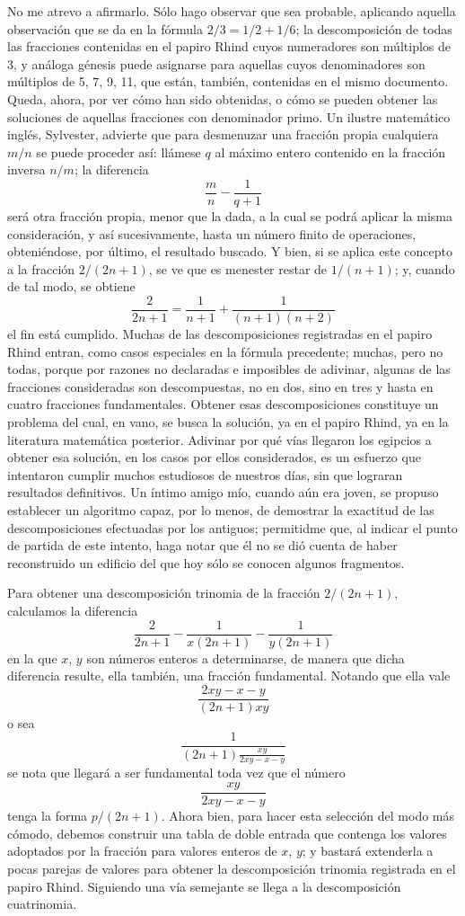 \documentclass[a4paper, 12pt, draft]{article}
\begin{document}
No me atrevo a afirmarlo. Sólo hago observar que sea probable, aplicando aquella observación que se da en la fórmula $2/3 = 1/2 + 1/6$; la descomposición de todas las fracciones contenidas en el papiro Rhind cuyos numeradores son múltiplos de 3, y análoga génesis puede asignarse para aquellas cuyos denominadores son múltiplos de 5, $7$, 9, 11, que están, también, contenidas en el mismo documento. Queda, ahora, por ver cómo han sido obtenidas, o cómo se pueden obtener las soluciones de aquellas fracciones con denominador primo. Un ilustre matemático inglés, Sylvester, advierte que para desmenuzar una fracción propia cualquiera $m/n$ se puede proceder así: llámese $q$ al máximo entero contenido en la fracción inversa $n/m$; la diferencia
$$
\frac{m}{n}-\frac{1}{q+1}
$$
será otra fracción propia, menor que la dada, a la cual se podrá aplicar la misma consideración, y así sucesivamente, hasta un número finito de operaciones, obteniéndose, por último, el resultado buscado. Y bien, si se aplica este concepto a la fracción
$2/(2n + 1)$, se ve que es menester restar de $1/(n + 1)$; y, cuando de tal modo, se obtiene
$$
\frac{2}{2n+1}=\frac{1}{n+1}+\frac{1}{(n+1)(n+2)}
$$
el fin está cumplido. Muchas de las descomposiciones registradas en el papiro Rhind entran, como casos especiales en la fórmula precedente; muchas, 
pero no todas, porque por razones no declaradas e imposibles de adivinar, algunas de las fracciones consideradas son descompuestas, no en dos, sino en tres y hasta en cuatro fracciones fundamentales. Obtener esas descomposiciones constituye un problema del cual, en vano, se busca la solución, ya en el papiro Rhind, ya en la literatura matemática posterior. Adivinar por qué vías llegaron los egipcios a obtener esa solución, en los casos por ellos considerados, es un esfuerzo que intentaron cumplir muchos estudiosos de nuestros días, sin que lograran resultados definitivos. Un íntimo amigo mío, cuando aún era joven, se propuso establecer un algoritmo capaz, por lo menos, de demostrar la exactitud de las descomposiciones efectuadas por los antiguos; permitidme que, al indicar el punto de partida de este intento, haga notar que él no se dió cuenta de haber reconstruido un edificio del que hoy sólo se conocen algunos fragmentos.

Para obtener una descomposición trinomia de la fracción $2/(2n + 1)$, calculamos la diferencia
$$
\frac{2}{2n+1}-\frac{1}{x(2n+1)}-\frac{1}{y(2n+1)}
$$
en la que $x$, $y$ son números enteros a determinarse, de manera que dicha diferencia resulte, ella también, una fracción fundamental. Notando que ella vale
$$
\frac{2xy-x-y}{(2n+1)xy}
$$
o sea
$$
\frac{1}{(2n+1)\displaystyle \frac{xy}{2xy-x-y}}
$$
se nota que llegará a ser fundamental toda vez que el número
$$
\frac{xy}{2xy-x-y}
$$
tenga la forma $p/(2n + 1)$. Ahora bien, para hacer
esta selección del modo más cómodo, debemos construir una tabla de doble entrada que contenga los
valores adoptados por la fracción para valores enteros de $x$, $y$; y bastará extenderla a pocas parejas
de valores para obtener la descomposición trinomia
registrada en el papiro Rhind. Siguiendo una vía
semejante se llega a la descomposición cuatrinomia.
\end{document}
